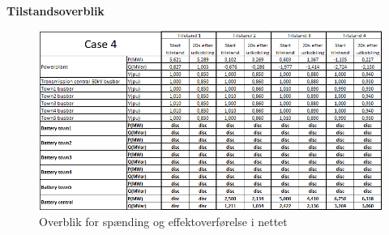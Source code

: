 \textbf{Tilstandsoverblik}
\begin{figure}[H] %
	\centering
	\includegraphics[width=1\textwidth]{figurer/LargeDisturbanceBatterypark/Overview}
	\caption{Overblik for spænding og effektoverførelse i nettet}
	\label{fig:C4Overview}
\end{figure}